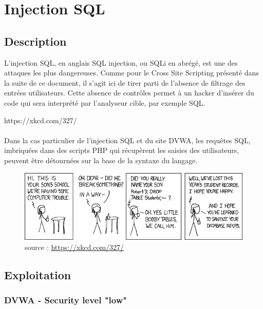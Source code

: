 
\newpage
\section{Injection SQL }


\subsection{Description}




L'injection SQL, en anglais SQL  injection, ou SQLi en abrégé, est une des attaques les plus dangereuses. Comme pour le Cross Site Scripting présenté dans la suite de ce document, il s'agit ici de tirer parti de l'absence de filtrage des entrées utilisateurs. Cette absence de contrôles permet à un hacker d'insérer du code qui sera interprété par l'analyseur cible, par exemple SQL.


https://xkcd.com/327/

\paragraph{}
Dans la cas particulier de l'injection SQL et du site DVWA, les requêtes SQL, imbriquées dans des scripts PHP qui récupèrent les saisies des utilisateurs, peuvent être détournées sur la base de la syntaxe du langage. 

\begin{figure}[!h]
	\begin{center}
		\includegraphics[scale=1]{images/bd.png}
		\caption{source : \url{https://xkcd.com/327/}}
	\end{center}
\end{figure}


\subsection{Exploitation}

\subsubsection{DVWA - Security level "low"}

